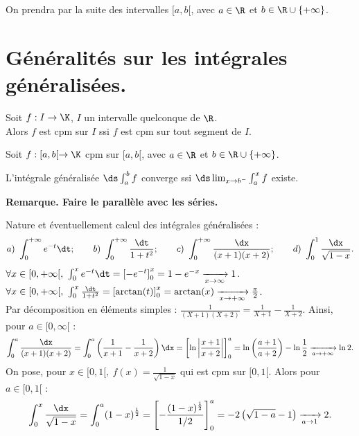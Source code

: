 \documentclass[11pt]{article}
\begin{document}


On prendra par la suite des intervalles $[a,b[$, avec $a\in\R$ et $b\in\R\cup\{+\infty\}$.

\section{Généralités sur les intégrales généralisées.}

\begin{defi}{}{}
    Soit $f:I\to\K$, $I$ un intervalle quelconque de $\R$.\\
    Alors $f$ est cpm sur $I$ ssi $f$ est cpm sur tout segment de $I$.
\end{defi}

\vspace*{-0.7cm}

\begin{defi}{}{}
    Soit $f:[a,b[\to\K$ cpm sur $[a,b[$, avec $a\in\R$ et $b\in\R\cup\{+\infty\}$.
    \begin{center}
        L'intégrale généralisée $\ds\int_a^bf$ converge ssi $\ds\lim_{x\to b^{-}}\int_a^x f$ existe.
    \end{center}
    \bf{Remarque.} Faire le parallèle avec les séries.
\end{defi}

\vspace*{-0.7cm}

\begin{ex}{}{}
    Nature et éventuellement calcul des intégrales généralisées :
    \begin{equation*}
        a) ~ \int_0^{+\infty}e^{-t}\dt; \qquad b) ~ \int_0^{+\infty}\frac{\dt}{1+t^2}; \qquad c) ~ \int_0^{+\infty}\frac{\dx}{(x+1)(x+2)}; \qquad d) ~ \int_0^1\frac{\dx}{\sqrt{1-x}}.
    \end{equation*}
    \tcblower
     $\forall x \in [0,+\infty[, ~ \int_0^xe^{-t}\dt = \left[ -e^{-t} \right]_0^x = 1-e^{-x}\xrightarrow[x\to\infty]{}1$.\\
     $\forall x \in [0,+\infty[, ~ \int_0^x\frac{\dt}{1+t^2} = \left[ \arctan(t) \right]_0^{x} = \arctan(x) \xrightarrow[x\to+\infty]{} \frac{\pi}{2}$.\\
     Par décomposition en éléments simples : $\frac{1}{(X+1)(X+2)}=\frac{1}{X+1} - \frac{1}{X+2}$. Ainsi, pour $a\in[0,\infty[$ :
    \begin{equation*}
        \int_0^a\frac{\dx}{(x+1)(x+2)} = \int_0^a\left( \frac{1}{x+1} - \frac{1}{x+2} \right)\dx = \left[ \ln\left|\frac{x+1}{x+2}\right| \right]_0^a = \ln\left( \frac{a+1}{a+2} \right) - \ln\frac{1}{2} \xrightarrow[a\to+\infty]{}\ln2.
    \end{equation*}
     On pose, pour $x\in[0,1[, ~ f(x)=\frac{1}{\sqrt{1-x}}$ qui est cpm sur $[0,1[$. Alors pour $a\in[0,1[$ :
    \begin{equation*}
        \int_0^x\frac{\dx}{\sqrt{1-x}} = \int_0^a(1-x)^{\frac{1}{2}} = \left[ -\frac{(1-x)^{\frac{1}{2}}}{1/2} \right]_0^a = -2\left( \sqrt{1-a} - 1\right) \xrightarrow[a\to1]{}2.
    \end{equation*}
\end{ex}
\end{document}
